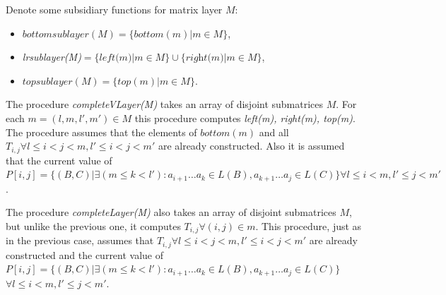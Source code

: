 Denote some subsidiary functions for matrix layer $M$:
 \begin{itemize}
  \item $bottomsublayer(M) = \{bottom(m) | m \in M \}$,
  \item \textit{lrsublayer(M)}$ = \{\textit{left(m)} | m \in M \} \cup \{\textit{right(m)} | m \in M \}$,
  \item $topsublayer(M) = \{top(m) | m \in M \}$.
\end{itemize}

The procedure \textit{completeVLayer(M)} takes an array of disjoint submatrices $M$.
For each $m = (l, m, l', m') \in M$ this procedure computes \textit{left(m), right(m), top(m)}.
The procedure assumes that the elements of $bottom(m)$ and all $T_{i, j} \forall l \leq i < j < m,  l' \leq i < j < m'$ are already constructed.
Also it is assumed that the current value of  $P[i, j] =  \{ (B, C) |\exists (m \le k < l'): a_{i + 1} \dots a_{k} \in L(B), a_{k + 1} \dots a_{j} \in L(C)\} \forall l \leq i < m,  l' \leq j < m'$.

The procedure \textit{completeLayer(M)} also takes an array of disjoint submatrices $M$, but unlike the previous one, it computes $T_{i, j} \forall (i, j) \in m$.
This procedure, just as in the previous case, assumes that  $T_{i, j} \forall l \leq i < j < m,  l' \leq i < j < m'$ are already constructed and the current value of  $P[i, j] =  \{ (B, C) |\exists (m \le k < l'): a_{i + 1} \dots a_{k} \in L(B), a_{k + 1} \dots a_{j} \in L(C)\}$ $\forall l \leq i < m,  l' \leq j < m'$.

